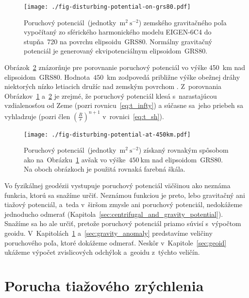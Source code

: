 \documentclass[a4paper,12pt]{book}
\begin{document}
\begin{figure}
\centering
\texttt{[image: ./fig-disturbing-potential-on-grs80.pdf]}
\caption{Poruchový potenciál~(jednotky~$\mathrm{m}^2 \ \mathrm{s}^{-2}$) 
zemského gravitačného poľa vypočítaný zo sférického harmonického modelu 
EIGEN-6C4 do stupňa~720 na povrchu elipsoidu~GRS80.  Normálny gravitačný 
potenciál je generovaný ekvipotenciálnym elipsoidom~GRS80.}
\label{fig:disturbing_potential_on_grs80}
\end{figure}

Obrázok~\ref{fig:disturbing_potential_at_450km} znázorňuje pre porovnanie 
poruchový potenciál vo výške 450~km nad elipsoidom~GRS80.  Hodnota~$450$~km 
zodpovedá približne výške obežnej dráhy niektorých nízko letiacich družíc nad 
zemským povrchom \parencite[pozri napríklad][]{MoritzPhysicalGeodesy}.  
Z~porovnania Obrázkov~\ref{fig:disturbing_potential_on_grs80} 
a~\ref{fig:disturbing_potential_at_450km} je zrejmé, že poruchový potenciál 
klesá s~narastajúcou vzdialenosťou od Zeme (pozri rovnicu~\ref{eq:t_infty}) 
a súčasne sa~jeho priebeh sa vyhladzuje (pozri člen $\left( \frac{R}{r} 
\right)^{n + 1}$ v~rovnici~\ref{eq:t_sh}).

\begin{figure}
\centering
\texttt{[image: ./fig-disturbing-potential-at-450km.pdf]}
\caption{Poruchový potenciál~(jednotky~$\mathrm{m}^2 \ \mathrm{s}^{-2}$) 
získaný rovnakým spôsobom ako 
na~Obrázku~\ref{fig:disturbing_potential_on_grs80} avšak vo výške~$450\ 
\mathrm{km}$ nad elipsoidom~GRS80.  Na oboch obrázkoch je použitá rovnaká 
farebná škála.}
\label{fig:disturbing_potential_at_450km}
\end{figure}

Vo fyzikálnej geodézii vystupuje poruchový potenciál väčšinou ako neznáma 
funkcia, ktorú sa snažíme určiť.  Neznámou funkciou je preto, lebo gravitačný 
ani tiažový potenciál, a~teda v~širšom zmysle ani poruchový potenciál, 
nedokážeme jednoducho odmerať 
(Kapitola~\ref{sec:centrifugal_and_gravity_potential}).  Snažíme sa ho ale 
určiť, pretože poruchový potenciál priamo súvisí s~výpočtom geoidu.  
V~Kapitolách~\ref{sec:gravity_disturbance} a~\ref{sec:gravity_anomaly} 
predstavíme veličiny poruchového poľa, ktoré dokážeme odmerať.  Neskôr 
v~Kapitole~\ref{sec:geoid} ukážeme výpočet zvislicových odchýlok a~geoidu 
z~týchto veličín.





\section{Porucha tiažového zrýchlenia}
\label{sec:gravity_disturbance}
\end{document}
